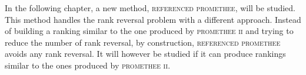 In the following chapter, a new method, \textsc{referenced promethee}, will be studied.
This method handles the rank reversal problem with a different approach.
Instead of building a ranking similar to the one produced by \textsc{promethee ii} and trying to reduce the number of rank reversal, by construction, \textsc{referenced promethee} avoids any rank reversal. 
It will however be studied if it can produce rankings similar to the ones produced by \textsc{promethee ii}.






